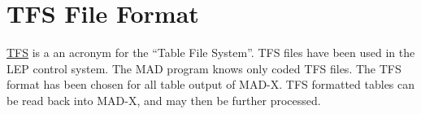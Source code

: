 
\chapter{TFS File Format}

\href{bibliography.html#tfs}{TFS} is a an acronym for the ``Table File
System''. TFS files have been used in the LEP control system. The MAD program
knows only coded TFS files. The TFS format has been chosen for all table
output of MAD-X. TFS formatted tables can be read back into MAD-X, and
may then be further processed.
 







